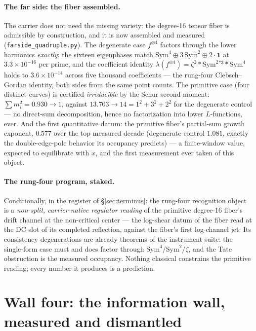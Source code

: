 \documentclass[11pt]{article}
\theoremstyle{definition}
\theoremstyle{remark}
\begin{document}
\paragraph{The far side: the fiber assembled.} The carrier does not need the
missing variety: the degree-16 tensor fiber is admissible by construction, and
it is now assembled and measured (\texttt{farside\_quadruple.py}). The
degenerate case $f^{\otimes4}$ factors through the lower harmonics
\emph{exactly}: the sixteen eigenphases match
$\mathrm{Sym}^4\oplus3\,\mathrm{Sym}^2\oplus2\cdot\mathbf 1$ at
$3.3\times10^{-16}$ per prime, and the coefficient identity
$\lambda(f^{\otimes4})=\zeta^2*\mathrm{Sym}^2{}^{*3}*\mathrm{Sym}^4$ holds to
$3.6\times10^{-14}$ across five thousand coefficients --- the rung-four
Clebsch--Gordan identity, both sides from the same point counts. The primitive
case (four distinct curves) is certified \emph{irreducible} by the Schur
second moment: $\sum m_i^2=0.930\to1$, against $13.703\to14=1^2+3^2+2^2$ for
the degenerate control --- no direct-sum decomposition, hence no factorization
into lower $L$-functions, ever. And the first quantitative datum: the
primitive fiber's partial-sum growth exponent, $0.577$ over the top measured
decade (degenerate control $1.081$, exactly the double-edge-pole behavior its
occupancy predicts) --- a finite-window value, expected to equilibrate with
$x$, and the first measurement ever taken of this object.

\paragraph{The rung-four program, staked.} Conditionally, in the register of
\S\ref{sec:terminus}: the rung-four recognition object is a \emph{non-split,
carrier-native regulator reading} of the primitive degree-16 fiber's drift
channel at the non-critical center --- the log-shear datum of the fiber read at
the DC slot of its completed reflection, against the fiber's first log-channel
jet. Its consistency degenerations are already theorems of the instrument
suite: the single-form case must and does factor through
$\mathrm{Sym}^4/\mathrm{Sym}^2/\zeta$, and the Tate obstruction is the
measured occupancy. Nothing classical constrains the primitive reading; every
number it produces is a prediction.

\section{Wall four: the information wall, measured and dismantled}\label{sec:wallfour}
\end{document}
